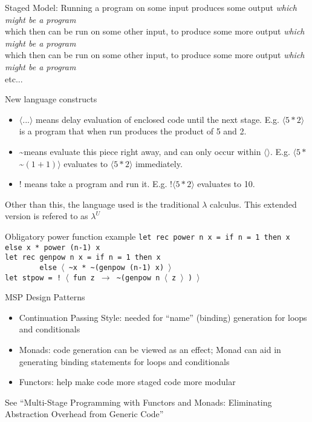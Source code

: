 \documentclass{beamer}
\begin{document}
\begin{frame}
Staged Model: Running a program on some input produces some output \textit{which might be a program}\\
which then can be run on some other input, to produce some more output \textit{which might be a program}\\
which then can be run on some other input, to produce some more output \textit{which might be a program}\\
etc...
\end{frame}

\begin{frame}{New language constructs}
\begin{itemize}
  \item $\langle ... \rangle$ means delay evaluation of enclosed code until the next stage. E.g. $\langle 5 * 2 \rangle$ is a program that when run produces the product of 5 and 2.
  \item \textasciitilde means evaluate this piece right away, and can only occur within $\langle \rangle$. E.g. $\langle 5 * $\textasciitilde $(1 + 1)\rangle$ evaluates to $\langle 5 * 2\rangle$ immediately.
  \item $!$ means take a program and run it. E.g. $!\langle 5 * 2 \rangle$ evaluates to 10.
\end{itemize}

Other than this, the language used is the traditional $\lambda$ calculus. This extended version is refered to as $\lambda ^U$
\end{frame}

\begin{frame}{Obligatory power function example}
\small
\texttt{let rec power n x = if n = 1 then x else x * power (n-1) x}\\
\texttt{let rec genpow n x = if n = 1 then x}\\
\texttt{\ \ \ \ \ \ \ \ else $\langle$ \textasciitilde x * \textasciitilde (genpow (n-1) x) $\rangle$}\\
\texttt{let stpow = ! $\langle$ fun z $\rightarrow$ \textasciitilde (genpow n $\langle$ z $\rangle$ ) $\rangle$}
\end{frame}

\begin{frame}{MSP Design Patterns}

\begin{itemize}
  \item Continuation Passing Style: needed for ``name'' (binding)
    generation for loops and conditionals
  \item Monads: code generation can be viewed as an effect; Monad can
    aid in generating binding statements for loops and conditionals
  \item Functors: help make code more staged code more modular
\end{itemize}

See ``Multi-Stage Programming with Functors and Monads: Eliminating
Abstraction Overhead from Generic Code''

\end{frame}
\end{document}

